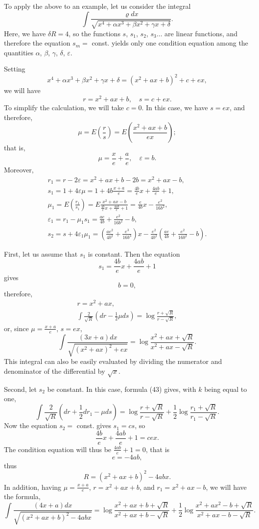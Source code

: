 \documentclass[oneside, 12 pt, leqno]{memoir}
\begin{document}
To apply the above to an example, let us consider the integral 
\[\int \frac{\varrho d x}{\sqrt{x^4+\alpha x^3+\beta x^2+\gamma x+\delta}}.\]
Here, we have \(\delta R=4\), so the functions \(s\), \(s_1\), \(s_2\), \(s_3 \dots\) are linear functions, and therefore the equation \(s_m=\) const. yields only one condition equation among the quantities \(\alpha\), \(\beta\), \(\gamma\), \(\delta\), \(\varepsilon\).

Setting
\[x^4+\alpha x^3+\beta x^2+\gamma x+\delta=\left(x^2+a x+b\right)^2+c+e x,\]
we will have
\[r=x^2+a x+b, \quad s=c+e x.\]
To simplify the calculation, we will take \(c=0\). In this case, we have \(s=e x\), and therefore,
\[\mu=E\left(\frac{r}{s}\right)=E\left(\frac{x^2+a x+b}{e x}\right);\]
that is,
\[\mu=\frac{x}{e}+\frac{a}{e}, \quad \varepsilon=b.\]
Moreover,
\[\begin{gathered}
r_1=r-2 \varepsilon=x^2+a x+b-2 b=x^2+a x-b,\\
s_1=1+4 \varepsilon \mu=1+4 b \frac{x+a}{e}=\frac{4 b}{e} x+\frac{4 a b}{e}+1, \\
\mu_1=E\left(\frac{r_1}{s_1}\right)=E \frac{x^2+a x-b}{\frac{4 b}{e} x+\frac{4 a b}{e}+1}=\frac{e}{4 b} x-\frac{e^2}{16 b^2}, \\
\varepsilon_1=r_1-\mu_1 s_1=\frac{a e}{4 b}+\frac{e^2}{16 b^2}-b, \\
s_2=s+4 \varepsilon_1 \mu_1=\left(\frac{a e^2}{4 b^2}+\frac{e^3}{16 b^3}\right) x-\frac{e^2}{4 b^2}\left(\frac{a e}{4 b}+\frac{e^2}{16 b^2}-b\right).
\end{gathered}\]

First, let us assume that \(s_1\) is constant. Then the equation
\[s_1=\frac{4 b}{e} x+\frac{4 a b}{e}+1\]
gives
\[b=0,\]
therefore,
\[\begin{gathered}
r=x^2+a x, \\
\int \frac{2}{\sqrt{R}}\left(d r-\frac{1}{2} \mu d s\right)=\log \frac{r+\sqrt{R}}{r-\sqrt{R}},
\end{gathered}\]
or, since \(\mu=\frac{x+a}{e}\), \(s=e x\),
\[\int \frac{(3 x+a) d x}{\sqrt{\left(x^2+a x\right)^2+e x}}=\log \frac{x^2+a x+\sqrt{R}}{x^2+a x-\sqrt{R}}.\]
This integral can also be easily evaluated by dividing the numerator and denominator of the differential by \(\sqrt{x}\).

Second, let \(s_2\) be constant. In this case, formula (43) gives, with \(k\) being equal to one,
\[\int \frac{2}{\sqrt{R}}\left(d r+\frac{1}{2} d r_1-\mu d s\right)=\log \frac{r+\sqrt{R}}{r-\sqrt{R}}+\frac{1}{2} \log \frac{r_1+\sqrt{R}}{r_1-\sqrt{R}}.\]
Now the equation \(s_2=\) const. gives \(s_1=c s\), so
\[\frac{4 b}{e} x+\frac{4 a b}{e}+1=c e x.\]
The condition equation will thus be \(\frac{4 a b}{e}+1=0\), that is
\[e=-4 a b,\]
thus
\[R=\left(x^2+a x+b\right)^2-4 a b x.\]
In addition, having \(\mu=\frac{x+a}{e}\), \(r=x^2+a x+b\), and \(r_1=x^2+a x-b\), we will have the formula,
\[\int \frac{(4 x+a) d x}{\sqrt{\left(x^2+a x+b\right)^2-4 a b x}}=\log \frac{x^2+a x+b+\sqrt{R}}{x^2+a x+b-\sqrt{R}}+\frac{1}{2} \log \frac{x^2+a x^2-b+\sqrt{R}}{x^2+a x-b-\sqrt{R}}.\]
\end{document}
